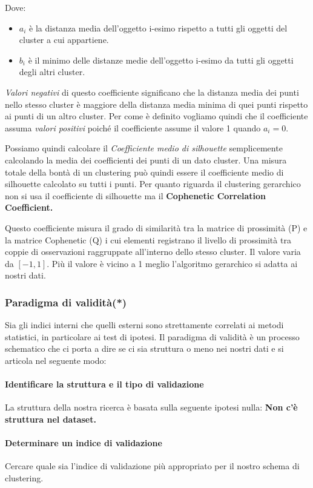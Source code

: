 Dove:
\begin{itemize}
	\item $a_{i}$ è la distanza media dell'oggetto i-esimo rispetto a tutti gli oggetti del cluster a cui appartiene.
	\item $b_{i}$ è il minimo delle distanze medie dell'oggetto i-esimo da tutti gli oggetti degli altri cluster.
\end{itemize}

\textit{Valori negativi} di questo coefficiente significano che la distanza media dei punti nello stesso cluster è maggiore della distanza media minima di quei punti rispetto ai punti di un altro cluster.  Per come è definito vogliamo quindi che il coefficiente assuma \textit{valori positivi} poiché il coefficiente assume il valore 1 quando $a_i = 0$.

Possiamo quindi calcolare il \textit{Coefficiente medio di silhouette} semplicemente calcolando la media dei coefficienti dei punti di un dato cluster. Una misura totale della bontà di un clustering può quindi essere il coefficiente medio di silhouette calcolato su tutti i punti.
Per quanto riguarda il clustering gerarchico non si usa il coefficiente di silhouette ma il \textbf{Cophenetic Correlation Coefficient.}

Questo coefficiente misura il grado di similarità tra la matrice di prossimità (P) e la matrice Cophenetic (Q) i cui elementi registrano il livello di prossimità tra coppie di osservazioni raggruppate all'interno dello stesso cluster.
 Il valore varia da $[-1,1]$. Più il valore è vicino a 1 meglio l'algoritmo gerarchico si adatta ai nostri dati.
 \subsubsection{Paradigma di validità(*)}

 Sia gli indici interni che quelli esterni sono strettamente correlati ai metodi statistici, in particolare ai test di ipotesi. Il paradigma di validità è un processo schematico che ci porta a dire se ci sia struttura o meno nei nostri dati e si articola nel seguente modo:
 
 \paragraph{Identificare la struttura e il tipo di validazione} La struttura della nostra ricerca è basata sulla seguente ipotesi nulla:
 \textbf{Non c'è struttura nel dataset.}
 \paragraph{Determinare un indice di validazione} Cercare quale sia l'indice di validazione più appropriato per il nostro schema di clustering.
